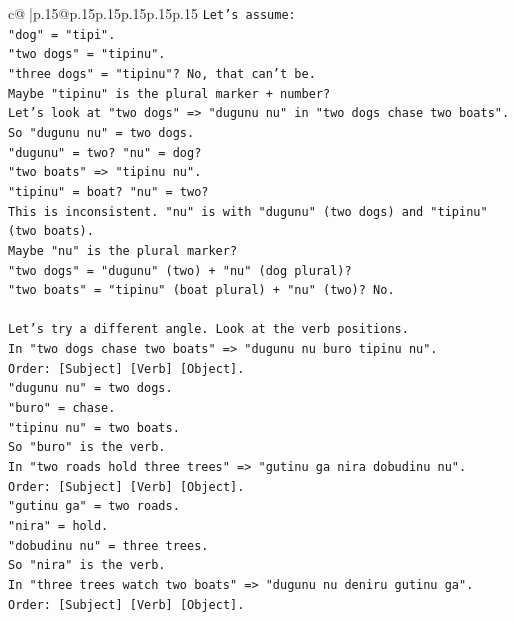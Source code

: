 \documentclass{article}
\begin{document}
{\begin{supertabular}{c@{$\;$}|p{.15\linewidth}@{}p{.15\linewidth}p{.15\linewidth}p{.15\linewidth}p{.15\linewidth}p{.15\linewidth}}
{{{\texttt{Let's assume:} \\
\texttt{"dog" = "tipi".} \\
\texttt{"two dogs" = "tipinu".} \\
\texttt{"three dogs" = "tipinu"? No, that can't be.} \\
\texttt{Maybe "tipinu" is the plural marker + number?} \\
\texttt{Let's look at "two dogs" => "dugunu nu" in "two dogs chase two boats".} \\
\texttt{So "dugunu nu" = two dogs.} \\
\texttt{"dugunu" = two? "nu" = dog?} \\
\texttt{"two boats" => "tipinu nu".} \\
\texttt{"tipinu" = boat? "nu" = two?} \\
\texttt{This is inconsistent. "nu" is with "dugunu" (two dogs) and "tipinu" (two boats).} \\
\texttt{Maybe "nu" is the plural marker?} \\
\texttt{"two dogs" = "dugunu" (two) + "nu" (dog plural)?} \\
\texttt{"two boats" = "tipinu" (boat plural) + "nu" (two)? No.} \\
\\ 
\texttt{Let's try a different angle. Look at the verb positions.} \\
\texttt{In "two dogs chase two boats" => "dugunu nu buro tipinu nu".} \\
\texttt{Order: {[}Subject{]} {[}Verb{]} {[}Object{]}.} \\
\texttt{"dugunu nu" = two dogs.} \\
\texttt{"buro" = chase.} \\
\texttt{"tipinu nu" = two boats.} \\
\texttt{So "buro" is the verb.} \\
\texttt{In "two roads hold three trees" => "gutinu ga nira dobudinu nu".} \\
\texttt{Order: {[}Subject{]} {[}Verb{]} {[}Object{]}.} \\
\texttt{"gutinu ga" = two roads.} \\
\texttt{"nira" = hold.} \\
\texttt{"dobudinu nu" = three trees.} \\
\texttt{So "nira" is the verb.} \\
\texttt{In "three trees watch two boats" => "dugunu nu deniru gutinu ga".} \\
\texttt{Order: {[}Subject{]} {[}Verb{]} {[}Object{]}.} \\
}}}
\end{supertabular}}
\end{document}
